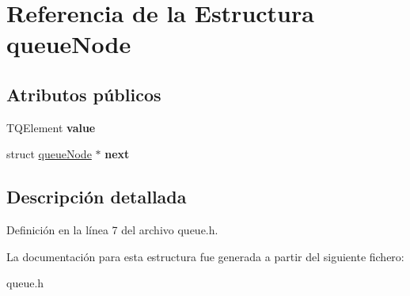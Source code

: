 \hypertarget{structqueue_node}{}\section{Referencia de la Estructura queue\+Node}
\label{structqueue_node}
\subsection*{Atributos públicos}
\begin{DoxyCompactItemize}
\item 
\mbox{\label{structqueue_node_a69c70e3a80d692eaaedbd4ecbcbf76ff}} 
T\+Q\+Element {\bfseries value}
\item 
\mbox{\label{structqueue_node_a35116e094cde90d7490dc4c85afba119}} 
struct \hyperlink{structqueue_node}{queue\+Node} $\ast$ {\bfseries next}
\end{DoxyCompactItemize}


\subsection{Descripción detallada}


Definición en la línea 7 del archivo queue.\+h.



La documentación para esta estructura fue generada a partir del siguiente fichero\+:\begin{DoxyCompactItemize}
\item 
queue.\+h\end{DoxyCompactItemize}
